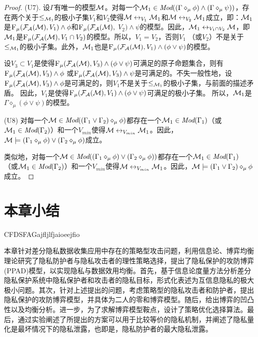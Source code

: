 \begin{proof}
	
	(U7). 设$\Gamma$有唯一的模型${\cal M}$。对每一个${\cal M}_1 \in \textit{Mod}((\Gamma \diamond_{\mu} \phi) \wedge (\Gamma \diamond_{\mu} \psi))$，存在两个关于$\leq_{{\cal M}_1}$的极小子集$V_1$和$V_2$使得${\cal M} \leftrightarrow_{V_1} {\cal M}_1$和${\cal M} \leftrightarrow_{V_2} {\cal M}_1$成立，即：${\cal M}_1$是${\textsc{F}_{\textsc{$\mu$}}}({\cal F}_{{\cal A}}({\cal M}), V_1) \wedge \phi$和${\textsc{F}_{\textsc{$\mu$}}}({\cal F}_{{\cal A}}({\cal M}),$ $V_2) \wedge \psi$的模型。因此，${\cal M}_1 \leftrightarrow_{V_1 \cap V_2} {\cal M}$，即${\cal M}_1$是${\textsc{F}_{\textsc{$\mu$}}}({\cal F}_{{\cal A}}({\cal M}), V_1 \cap V_2)$的模型。所以，$V_1 = V_2$，否则$V_1$ （或$V_2$）不是关于$\leq_{{\cal M}_1}$的极小子集。此外，${\cal M}_1$也是${\textsc{F}_{\textsc{$\mu$}}}({\cal F}_{{\cal A}}({\cal M}), V_1) \wedge (\phi \vee \psi)$的模型。
	
	设$V_3\subset V_1$是使得${\textsc{F}_{\textsc{$\mu$}}}({\cal F}_{{\cal A}}({\cal M}), V_3) \wedge (\phi \vee \psi)$可满足的原子命题集合，则有${\textsc{F}_{\textsc{$\mu$}}}({\cal F}_{{\cal A}}({\cal M}), V_3) \wedge \phi$ 或${\textsc{F}_{\textsc{$\mu$}}}({\cal F}_{{\cal A}}({\cal M}), V_3) \wedge \psi$是可满足的。不失一般性地，设${\textsc{F}_{\textsc{$\mu$}}}({\cal F}_{{\cal A}}({\cal M}), V_3) \wedge \phi$是可满足的，则$V_1$不是关于$\leq_{{\cal M}_1}$的极小子集，与前面的描述矛盾。
	因此，$V_1$是使得${\textsc{F}_{\textsc{$\mu$}}}({\cal F}_{{\cal A}}({\cal M}), V_1) \wedge (\phi \vee \psi)$可满足的极小子集。
	所以，${\cal M}_1$是$\Gamma \diamond_{\mu} (\phi \vee \psi)$的模型。
	
	(U8) 对每一个${\cal M} \in \textit{Mod}((\Gamma_1 \vee \Gamma_2) \diamond_{\mu} \phi)$都存在一个${\cal M}_1 \in \textit{Mod}(\Gamma_1)$（或${\cal M}_1\in \textit{Mod}(\Gamma_2)$）和一个$V_{min}$使得${\cal M} \leftrightarrow_{V_{min}} {\cal M}_1$。因此，${\cal M} \models  (\Gamma_1 \diamond_{\mu} \phi) \vee (\Gamma_2 \diamond_{\mu} \phi)$成立。
	
	类似地，对每一个${\cal M} \in \textit{Mod}( (\Gamma_1 \diamond_{\mu} \phi) \vee (\Gamma_2 \diamond_{\mu} \phi))$都存在一个${\cal M}_1\in \textit{Mod}(\Gamma_1)$ （或${\cal M}_1 \in \textit{Mod}(\Gamma_2)$）和一个$V_{min}$使得${\cal M} \leftrightarrow_{V_{min}} {\cal M}_1$。因此，${\cal M} \models (\Gamma_1 \vee \Gamma_2) \diamond_{\mu} \phi$成立。
\end{proof}

\section{本章小结}\label{sec:chapter07-conclusion}
CFDSFAGajfljlfjaioeejfio

本章针对差分隐私数据收集应用中存在的策略型攻击问题，利用信息论、博弈均衡理论研究了隐私防护者与隐私攻击者的理性策略选择，提出了隐私保护的攻防博弈(PPAD)模型，以实现隐私与数据效用均衡。首先，基于信息论度量方法分析差分隐私保护系统中隐私保护者和攻击者的隐私目标，形式化表述为互信息隐私的极大极小问题。其次，针对上述提出的问题，考虑策略型的隐私攻击者和防护者，提出隐私保护的攻防博弈模型，并具体为二人的零和博弈模型。随后，给出博弈的凹凸性以及均衡分析。进一步，为了求解博弈模型鞍点，设计了策略优化选择算法。最后，通过实验阐述了所提出的方案可以用于比较等价的隐私机制，并阐述了隐私量化是最坏情况下的隐私泄露，也即是，隐私防护者的最大隐私泄露。
